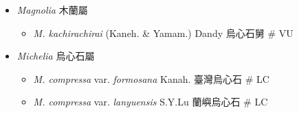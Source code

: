 
  \begin{itemize}
 \item[] \textit{Magnolia} 木蘭屬
                                
  \begin{itemize}
        \item[] \textit{M. kachirachirai} (Kaneh. \& Yamam.) Dandy  烏心石舅  \# VU
  \end{itemize}
 \item[] \textit{Michelia} 烏心石屬
                                
  \begin{itemize}
        \item[] \textit{M. compressa} var. \textit{formosana} Kanah.  臺灣烏心石  \# LC
        \item[] \textit{M. compressa} var. \textit{lanyuensis} S.Y.Lu  蘭嶼烏心石  \# LC
  \end{itemize}
  \end{itemize}
